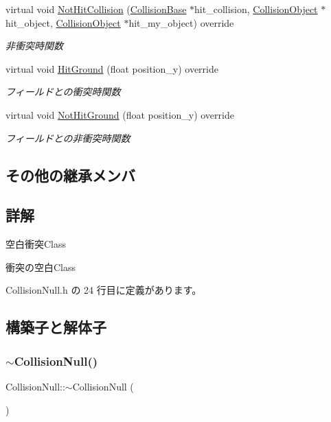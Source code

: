 \begin{DoxyCompactItemize}
virtual void \mbox{\hyperlink{class_collision_null_aad9ac22b94ed4365c15aad56858ba37a}{Not\+Hit\+Collision}} (\mbox{\hyperlink{class_collision_base}{Collision\+Base}} $\ast$hit\+\_\+collision, \mbox{\hyperlink{class_collision_object}{Collision\+Object}} $\ast$hit\+\_\+object, \mbox{\hyperlink{class_collision_object}{Collision\+Object}} $\ast$hit\+\_\+my\+\_\+object) override
\begin{DoxyCompactList}\small\item\em 非衝突時関数 \end{DoxyCompactList}\item 
virtual void \mbox{\hyperlink{class_collision_null_ac5645bca5f03262d1918e2ff8348440d}{Hit\+Ground}} (float position\+\_\+y) override
\begin{DoxyCompactList}\small\item\em フィールドとの衝突時関数 \end{DoxyCompactList}\item 
virtual void \mbox{\hyperlink{class_collision_null_a77004653a17a43a8a4809297e6c71422}{Not\+Hit\+Ground}} (float position\+\_\+y) override
\begin{DoxyCompactList}\small\item\em フィールドとの非衝突時関数 \end{DoxyCompactList}\end{DoxyCompactItemize}
\subsection*{その他の継承メンバ}


\subsection{詳解}
空白衝突\+Class 

衝突の空白\+Class 

 Collision\+Null.\+h の 24 行目に定義があります。



\subsection{構築子と解体子}
\mbox{\label{class_collision_null_a8cbc0114a4dcc343635787d50c6ce007}} 
\subsubsection{\texorpdfstring{$\sim$\+Collision\+Null()}{~CollisionNull()}}
{\footnotesize\ttfamily Collision\+Null\+::$\sim$\+Collision\+Null (\begin{DoxyParamCaption}{ }\end{DoxyParamCaption})\hspace{0.3cm}{\ttfamily [virtual]}}



